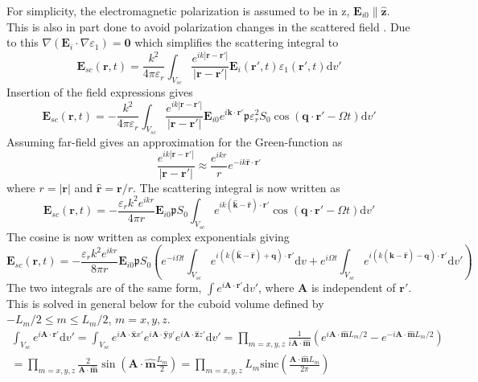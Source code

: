 \documentclass[10pt,a4paper]{eitExjobb}
\begin{document}
	For simplicity, the electromagnetic polarization is assumed to be in z, $\bm{E}_{i0} \parallel \bm{\hat{z}}$. This is also in part done to avoid polarization changes in the scattered field \cite{Korpel1988}. Due to this $\nabla(\bm{E}_i \cdot \nabla \varepsilon_1) = \bm{0}$ which simplifies the scattering integral to
	\begin{equation*}
	\bm{E}_{sc}(\bm{r},t) = \frac{k^2}{4\pi\varepsilon_r} \int_{V_{sc}} \frac{e^{ik |\bm{r}-\bm{r'}| }}{ |\bm{r}-\bm{r'}|} \bm{E}_i (\bm{r'},t) \varepsilon_1 (\bm{r'},t) \mathrm{d}v'
	\end{equation*}
	Insertion of the field expressions gives
	\begin{equation*}
	\bm{E}_{sc}(\bm{r},t) = -\frac{k^2}{4\pi\varepsilon_r} \int_{V_{sc}} \frac{e^{ik |\bm{r}-\bm{r'}| }}{ |\bm{r}-\bm{r'}|} \bm{E}_{i0} e^{i\bm{k} \cdot \bm{r}'} \mathfrak{p} \varepsilon_r^2 S_0 \cos(\bm{q} \cdot \bm{r}' - \Omega t) \mathrm{d}v'
	\end{equation*}
	Assuming far-field gives an approximation for the Green-function as \cite{Kristensson2008}
	\begin{equation*}
	\frac{e^{ik |\bm{r}-\bm{r'}| }}{ |\bm{r}-\bm{r'}|} \approx \frac{e^{ikr}}{r} e^{-ik \bm{\hat{r}} \cdot \bm{r}'}
	\end{equation*}
	where $r = |\bm{r}|$ and $\bm{\hat{r}} = \bm{r}/r$. The scattering integral is now written as
	\begin{equation*}
	\bm{E}_{sc}(\bm{r},t) = -\frac{\varepsilon_rk^2 e^{ikr}}{4\pi r} \bm{E}_{i0} \mathfrak{p} S_0 \int_{V_{sc}} e^{ik ( \bm{\hat{k}} - \bm{\hat{r}} ) \cdot \bm{r}'} \cos(\bm{q} \cdot \bm{r}' - \Omega t) \mathrm{d}v'
	\end{equation*}
	The cosine is now written as complex exponentials giving
	\begin{equation*}
	\bm{E}_{sc}(\bm{r},t) = -\frac{\varepsilon_rk^2 e^{ikr}}{8\pi r} \bm{E}_{i0} \mathfrak{p} S_0 \left( e^{-i\Omega t} \int_{V_{sc}} e^{i( k(\bm{\hat{k}} - \bm{\hat{r}}) + \bm{q} ) \cdot \bm{r}'} \mathrm{d}v + e^{i\Omega t} \int_{V_{sc}} e^{i( k(\bm{\hat{k}} - \bm{\hat{r}}) - \bm{q} ) \cdot \bm{r}'} \mathrm{d}v' \right)
	\end{equation*}
	The two integrals are of the same form, $\int e^{i\bm{A} \cdot \bm{r}'} \mathrm{d}v'$, where $\bm{A}$ is independent of $\bm{r}'$. This is solved in general below for the cuboid volume defined by $-L_m/2 \leq m \leq L_m/2$, $m = x,y,z$.
	\begin{multline*}
	\int_{V_{sc}} e^{i\bm{A} \cdot \bm{r}'} \mathrm{d}v' =
	\int_{V_{sc}} e^{i\bm{A} \cdot \bm{\hat{x}} x'} e^{i\bm{A} \cdot \bm{\hat{y}} y'} e^{i\bm{A} \cdot \bm{\hat{z}} z'} \mathrm{d}v' =
	\prod_{m = x,y,z} \frac{1}{i \bm{A} \cdot \bm{\hat{m}}} \left( e^{i\bm{A} \cdot \bm{\hat{m}} L_m/2} - e^{-i\bm{A} \cdot \bm{\hat{m}} L_m/2} \right) \\
	= \prod_{m = x,y,z} \frac{2}{\bm{A} \cdot \bm{\hat{m}}} \sin \left(\bm{A} \cdot \bm{\hat{m}} \frac{L_m}{2} \right) =
	\prod_{m = x,y,z} L_m \text{sinc} \left( \frac{\bm{A} \cdot \bm{\hat{m}} L_m}{2\pi} \right)
	\end{multline*}
\end{document}

